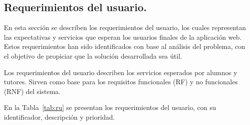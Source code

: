 \subsection{Requerimientos del usuario.}

En esta sección se describen los requerimientos del usuario, los cuales representan las expectativas y servicios que esperan los usuarios finales de la aplicación web. Estos requerimientos han sido identificados con base al análisis del problema, con el objetivo de propiciar que la solución desarrollada sea útil.

Los requerimientos del usuario describen los servicios esperados por alumnos y tutores. Sirven como base para los requisitos funcionales (RF) y no funcionales (RNF) del sistema.

En la Tabla~\ref{tab:ru} se presentan los requerimientos del usuario, con su identificador, descripción y prioridad.

